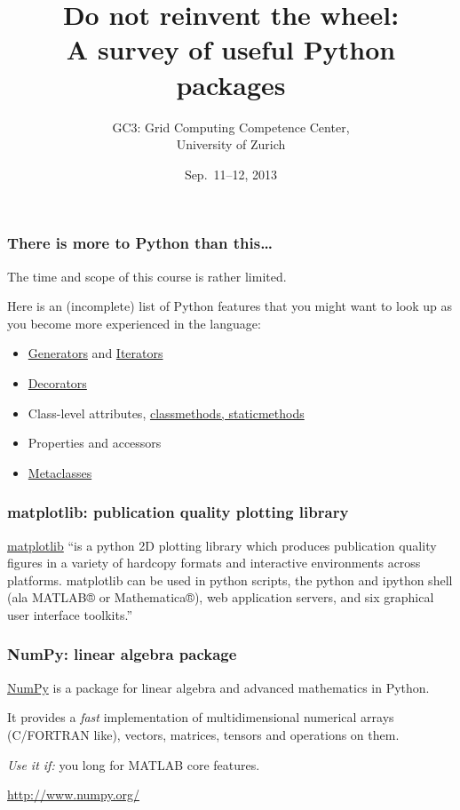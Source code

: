 \documentclass[english,serif,mathserif,xcolor=pdftex,dvipsnames,table]{beamer}
\title[Introduction]{%
  Do not reinvent the wheel:
  \\
  A survey of useful Python packages
}
\author[GC3]{%
  GC3: Grid Computing Competence Center, \\
  University of Zurich
}
\date{Sep.~11--12, 2013}
\begin{document}
\maketitle

\begin{frame}
  \frametitle{There is more to Python than this\ldots}

  The time and scope of this course is rather limited.

  \+
  Here is an (incomplete) list of Python features that you might
  want to look up as you become more experienced in the language:
  \begin{itemize}
  \item
    \href{http://docs.python.org/2/tutorial/classes.html\#generators}{Generators}
    and
    \href{http://docs.python.org/2/tutorial/classes.html\#iterators}{Iterators}
  \item \href{http://www.artima.com/weblogs/viewpost.jsp?thread=240808}{Decorators}
  \item Class-level attributes, \href{http://stackoverflow.com/a/12179752/1808780}{classmethods, staticmethods}
  \item Properties and accessors
  \item \href{http://stackoverflow.com/a/6581949/459543}{Metaclasses}
  \end{itemize}
\end{frame}


\begin{frame}
  \frametitle{matplotlib: publication quality plotting library}

  \href{http://matplotlib.org/}{matplotlib} ``is a python 2D plotting
  library which produces publication quality figures in a variety of
  hardcopy formats and interactive environments across
  platforms. matplotlib can be used in python scripts, the python and
  ipython shell (ala MATLAB® or Mathematica®), web application
  servers, and six graphical user interface toolkits.''
\end{frame}


\begin{frame}
  \frametitle{NumPy: linear algebra package}

  \href{http://www.numpy.org/}{NumPy} is a package for linear algebra
  and advanced mathematics in Python.

  \+ It provides a \emph{fast} implementation of multidimensional
  numerical arrays (C/FORTRAN like), vectors, matrices, tensors and
  operations on them.

  \+ \emph{Use it if:} you long for MATLAB core features.

  \begin{seealso}
    \url{http://www.numpy.org/}
  \end{seealso}
\end{frame}
\end{document}
